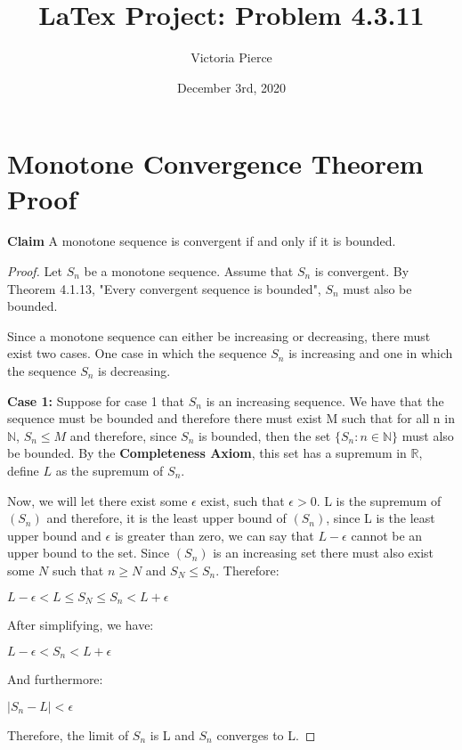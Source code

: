 \documentclass[a4paper,12pt]{article}
\title{LaTex Project: Problem 4.3.11}
\author{Victoria Pierce }
\date{December 3rd, 2020}
\newcommand{\R}{\mathbb{R}}
\newcommand{\N}{\mathbb{N}}
\begin{document}
\maketitle

\section{Monotone Convergence Theorem Proof}
    \textbf{Claim} A monotone sequence is convergent if and only if it is bounded.
    
    
    \begin{proof}                                 
    Let $S_{n}$ be a monotone sequence. Assume that $S_{n}$ is convergent. By Theorem 4.1.13, "Every convergent sequence is bounded", $S_{n}$ must also be bounded.
    
    Since a monotone sequence can either be increasing or decreasing, there must exist two cases. One case in which the sequence $S_{n}$ is increasing and one in which the sequence $S_{n}$ is decreasing.
    
    \textbf{Case 1:}  Suppose for case 1 that $S_{n}$ is an increasing sequence. We have that the sequence must be bounded and therefore there must exist M such that for all n in $\N$, $S_{n}\leq M$ and therefore, since $S_{n}$ is bounded, then the set $\{S_{n}: n \in \N\}$ must also be bounded. By the \textbf{Completeness Axiom}, this set has a supremum in $\R$, define $L$ as the supremum of $S_{n}$.
    \vspace{2mm}
    
    Now, we will let there exist some $\epsilon$ exist, such that $\epsilon>0$. L is the supremum of $(S_{n})$ and therefore, it is the least upper bound of $(S_{n})$, since L is the least upper bound and $\epsilon$ is greater than zero, we can say that  $L-\epsilon$ cannot be an upper bound to the set. Since $(S_{n})$ is an increasing set there must also exist some $N$ such that $n\geq N$ and $S_{N} \leq S_{n}$. Therefore:
    \begin{center}
        $L-\epsilon < L \leq S_{N} \leq S_{n} < L +\epsilon$
    \end{center}
    After simplifying, we have:
    \begin{center}
        $L-\epsilon < S_{n} < L +\epsilon$
    \end{center}
    And furthermore:
     \begin{center}
        $|S_{n}-L|<\epsilon$
    \end{center}
    Therefore, the limit of $S_{n}$ is L and $S_{n}$ converges to L.
       \vspace{2mm}


\end{proof}
\end{document}
